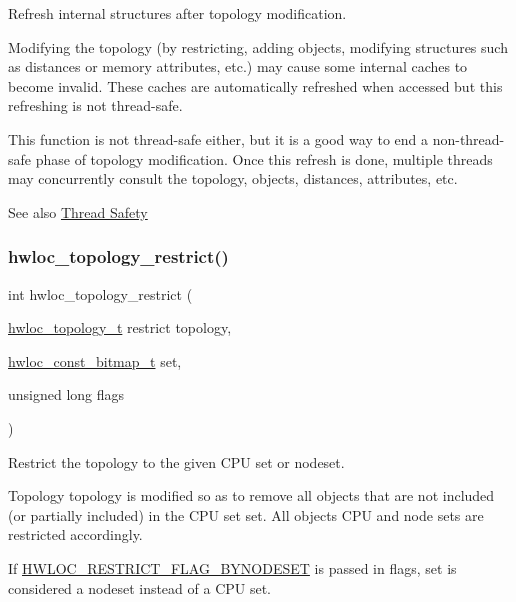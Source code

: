 Refresh internal structures after topology modification. 

Modifying the topology (by restricting, adding objects, modifying structures such as distances or memory attributes, etc.) may cause some internal caches to become invalid. These caches are automatically refreshed when accessed but this refreshing is not thread-\/safe.

This function is not thread-\/safe either, but it is a good way to end a non-\/thread-\/safe phase of topology modification. Once this refresh is done, multiple threads may concurrently consult the topology, objects, distances, attributes, etc.

See also \hyperlink{a00391}{Thread Safety} \mbox{\label{a00194_ga6db81ed13ac0a9d70cc80372ab537815}} 
\subsubsection{\texorpdfstring{hwloc\+\_\+topology\+\_\+restrict()}{hwloc\_topology\_restrict()}}
{\footnotesize\ttfamily int hwloc\+\_\+topology\+\_\+restrict (\begin{DoxyParamCaption}\item[{\hyperlink{a00186_ga9d1e76ee15a7dee158b786c30b6a6e38}{hwloc\+\_\+topology\+\_\+t} restrict}]{topology,  }\item[{\hyperlink{a00205_gae991a108af01d408be2776c5b2c467b2}{hwloc\+\_\+const\+\_\+bitmap\+\_\+t}}]{set,  }\item[{unsigned long}]{flags }\end{DoxyParamCaption})}



Restrict the topology to the given C\+PU set or nodeset. 

Topology {\ttfamily topology} is modified so as to remove all objects that are not included (or partially included) in the C\+PU set {\ttfamily set}. All objects C\+PU and node sets are restricted accordingly.

If \hyperlink{a00194_gga9d80f08eb25b7ac22f1b998dc8bf521fae4c5b1b87232f2d8a60559e77ac65a68}{H\+W\+L\+O\+C\+\_\+\+R\+E\+S\+T\+R\+I\+C\+T\+\_\+\+F\+L\+A\+G\+\_\+\+B\+Y\+N\+O\+D\+E\+S\+ET} is passed in {\ttfamily flags}, {\ttfamily set} is considered a nodeset instead of a C\+PU set.

